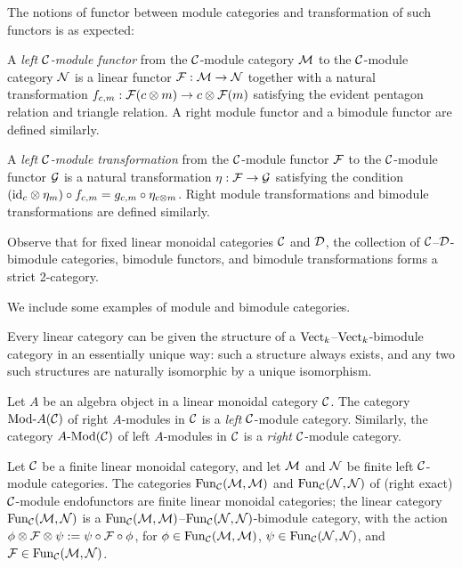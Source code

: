 \documentclass{amsart}
\begin{document}
The notions of functor between module categories and transformation of such functors is as expected:
\begin{definition}
A \emph{left $\mathcal C$-module functor} from the $\mathcal C$-module category $\mathcal M$ to the $\mathcal C$-module category $\mathcal N$ is a linear functor $\mathcal F: \mathcal M \rightarrow \mathcal N$ together with a natural transformation $f_{c,m}:\mathcal F(c \otimes m) \rightarrow c \otimes \mathcal F(m)$ satisfying the evident pentagon relation and triangle relation.  A right module functor and a bimodule functor are defined similarly.
\end{definition}
\begin{definition}
A \emph{left $\mathcal C$-module transformation} from the $\mathcal C$-module functor $\mathcal F$ to the $\mathcal C$-module functor $\mathcal G$ is a natural transformation $\eta: \mathcal F \rightarrow \mathcal G$ satisfying the condition $(\mathrm{id}_c \otimes \eta_m) \circ f_{c,m} = g_{c,m} \circ \eta_{c \otimes m}$.  Right module transformations and bimodule transformations are defined similarly.
\end{definition}

\nid Observe that for fixed linear monoidal categories $\mathcal C$ and $\mathcal D$, the collection of $\mathcal C$--$\mathcal D$-bimodule categories, bimodule functors, and bimodule transformations forms a strict 2-category.

We include some examples of module and bimodule categories.

\begin{example}
Every linear category can be given the structure of a $\mathrm{Vect}_k$--$\mathrm{Vect}_k$-bimodule category in an essentially unique way: such a structure always exists, and any two such structures are naturally isomorphic by a unique isomorphism.
\end{example} %

\begin{example}
Let $A$ be an algebra object in a linear monoidal category $\mathcal C$.  The category $\Mod{}{A}(\cC)$ of right $A$-modules in $\mathcal C$ is a \emph{left} $\mathcal C$-module category.  Similarly, the category $\Mod{A}{}(\cC)$ of left $A$-modules in $\mathcal C$ is a \emph{right} $\mathcal C$-module category.
\end{example} %

\begin{example}
Let $\mathcal C$ be a finite linear monoidal category, and let $\mathcal M$ and $\mathcal N$ be finite left $\mathcal C$-module categories.  The categories $\operatorname{Fun}_{\mathcal C}(\mathcal M, \mathcal M)$ and $\operatorname{Fun}_{\mathcal C}(\mathcal N, \mathcal N)$ of (right exact) $\mathcal C$-module endofunctors are finite linear monoidal categories; the linear category $\operatorname{Fun}_{\mathcal C}(\mathcal M, \mathcal N)$ is a $\operatorname{Fun}_{\mathcal C}(\mathcal M, \mathcal M)$--$\operatorname{Fun}_{\mathcal C}(\mathcal N, \mathcal N)$-bimodule category, with the action $\phi \otimes \mathcal F \otimes \psi := \psi \circ \mathcal F \circ \phi$, for $\phi \in \operatorname{Fun}_\mathcal C(\mathcal M,\mathcal M)$, $\psi \in \operatorname{Fun}_\mathcal C(\mathcal N,\mathcal N)$, and $\mathcal F \in \operatorname{Fun}_\mathcal C(\mathcal M,\mathcal N)$.
\end{example}
\end{document}
